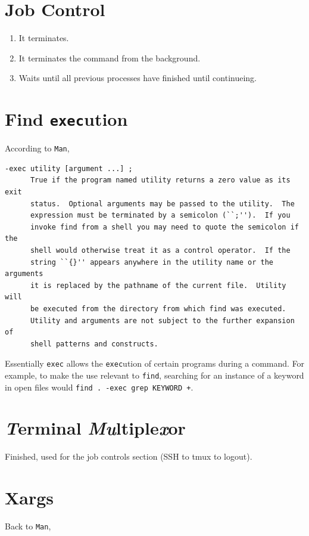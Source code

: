 \documentclass{article}
\newcommand{\shellcmd}[1]{\texttt{\colorbox{gray!30}{#1}}}
\begin{document}
\section{Job Control}
\begin{enumerate}
    \item It terminates.
    \item It terminates the command from the background.
    \item Waits until all previous processes have finished until continueing.
\end{enumerate}

\section{Find \shellcmd{exec}ution}
According to \shellcmd{Man},

\begin{verbatim}
-exec utility [argument ...] ;
      True if the program named utility returns a zero value as its exit
      status.  Optional arguments may be passed to the utility.  The
      expression must be terminated by a semicolon (``;'').  If you
      invoke find from a shell you may need to quote the semicolon if the
      shell would otherwise treat it as a control operator.  If the
      string ``{}'' appears anywhere in the utility name or the arguments
      it is replaced by the pathname of the current file.  Utility will
      be executed from the directory from which find was executed.
      Utility and arguments are not subject to the further expansion of
      shell patterns and constructs.
\end{verbatim}

Essentially \shellcmd{exec} allows the \shellcmd{exec}ution of certain programs during a command. For example, to make the use relevant to \shellcmd{find}, searching for an instance of a keyword in open files would \shellcmd{find . -exec grep KEYWORD {} +}.


\section{\textit{T}erminal \textit{Mu}ltiple\textit{x}or}
Finished, used for the job controls section (SSH to tmux to logout).

\section{Xargs}
Back to \shellcmd{Man},
\end{document}
